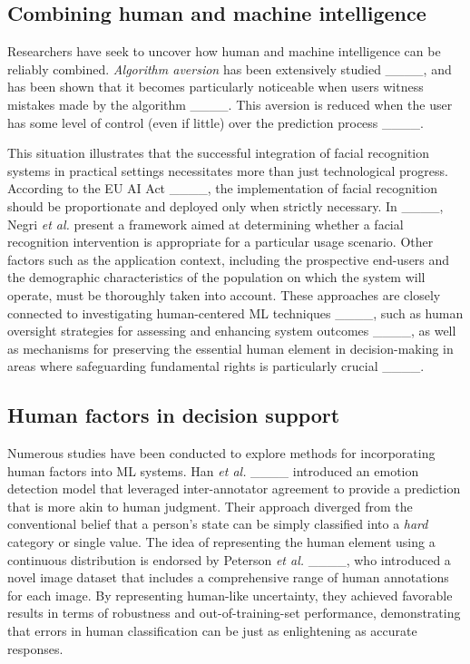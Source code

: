 \subsection{Combining human and machine intelligence}
Researchers have seek to uncover how human and machine intelligence can be reliably combined.
%
\textit{Algorithm aversion} has been extensively studied ____, and has been shown that it becomes particularly noticeable when users witness mistakes made by the algorithm ____. This aversion is reduced when the user has some level of control (even if little) over the prediction process ____.

This situation illustrates that the successful integration of facial recognition systems in practical settings necessitates more than just technological progress. According to the EU AI Act ____, the implementation of facial recognition should be proportionate and deployed only when strictly necessary. In ____, Negri {\em et al.} present a framework aimed at determining whether a facial recognition intervention is appropriate for a particular usage scenario.
%
Other factors such as the application context, including the prospective end-users and the demographic characteristics of the population on which the system will operate, must be thoroughly taken into account. These approaches are closely connected to investigating human-centered ML techniques ____, such as human oversight strategies for assessing and enhancing system outcomes ____, as well as mechanisms for preserving the essential human element in decision-making in areas where safeguarding fundamental rights is particularly crucial ____. 

\subsection{Human factors in decision support}
Numerous studies have been conducted to explore methods for incorporating human factors into ML systems. Han {\em et al.} ____ introduced an emotion detection model that leveraged inter-annotator agreement to provide a prediction that is more akin to human judgment. Their approach diverged from the conventional belief that a person's state can be simply classified into a \textit{hard} category or single value.
The idea of representing the human element using a continuous distribution is endorsed by Peterson {\em et al.} ____, who introduced a novel image dataset that includes a comprehensive range of human annotations for each image. By representing human-like uncertainty, they achieved favorable results in terms of robustness and out-of-training-set performance, demonstrating that errors in human classification can be just as enlightening as accurate responses. 
%

